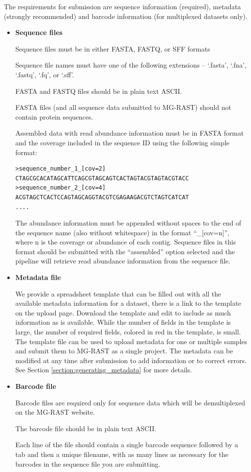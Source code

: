 \documentclass[12pt,fullpage]{report}
\begin{document}
The requirements for submission are sequence information (required), metadata (strongly recommended) and barcode information (for multiplexed datasets only).

\begin{itemize}
\item {\bf Sequence files}

Sequence files must be in either FASTA, FASTQ, or SFF formats

Sequence file names must have one of the following extensions -- `.fasta', `.fna', `.fastq', `.fq', or `.sff'.

FASTA and FASTQ files should be in plain text ASCII.

FASTA files (and all sequence data submitted to MG-RAST) should not contain protein sequences.

Assembled data with read abundance information must be in FASTA format and the coverage included in the sequence ID using the following simple format:
\begin{verbatim}
>sequence_number_1_[cov=2]
CTAGCGCACATAGCATTCAGCGTAGCAGTCACTAGTACGTAGTACGTACC
>sequence_number_2_[cov=4]
ACGTAGCTCACTCCAGTAGCAGGTACGTCGAGAAGACGTCTAGTCATCAT
....
\end{verbatim}
The abundance information must be appended without spaces to the end of the sequence name (also without whitespace) in the format ``\_[cov=n]'', where n is the coverage or abundance of each contig.
Sequence files in this format should be submitted with the ``assembled'' option selected and the pipeline will retrieve read abundance information from the sequence file.

\item {\bf Metadata file}

We provide a spreadsheet template that can be filled out with all the available metadata information for a dataset, there is a link to the template on the upload page. Download the template and edit to include as much information as is available. While the number of fields in the template is large, the number of required fields, colored in red in the template, is small. The template file can be used to upload metadata for one or multiple samples and submit them to MG-RAST as a single project. The metadata can be modified at any time after submission to add information or to correct errors. See Section \ref{section:generating_metadata} for more details.

\item {\bf Barcode file}

Barcode files are required only for sequence data which will be demultiplexed on the MG-RAST website.

The barcode file should be in plain text ASCII.

Each  line of the file should contain a single barcode sequence followed by a tab and then a unique filename, with as many lines as necessary for the barcodes in the sequence file you are submitting.

\end{itemize}
\end{document}
